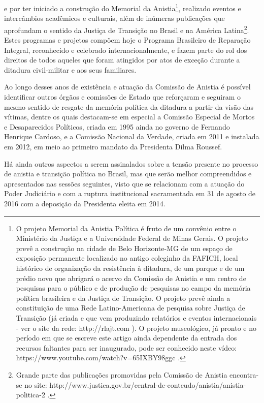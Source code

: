 e por ter iniciado a construção do Memorial da Anistia\footnote{O
  projeto Memorial da Anistia Política é fruto de um convênio entre o
  Ministério da Justiça e a Universidade Federal de Minas Gerais. O
  projeto prevê a construção na cidade de Belo Horizonte-MG de um espaço
  de exposição permanente localizado no antigo coleginho da FAFICH,
  local histórico de organização da resistência à ditadura, de um parque
  e de um prédio novo que abrigará o acervo da Comissão de Anistia e um
  centro de pesquisas para o público e de produção de pesquisas no campo
  da memória política brasileira e da Justiça de Transição. O projeto
  prevê ainda a constituição de uma Rede Latino-Americana de pesquisa
  sobre Justiça de Transição (já criada e que vem produzindo relatórios
  e eventos internacionais - ver o site da rede: http://rlajt.com ). O
  projeto museológico, já pronto e no período em que se escreve este
  artigo ainda dependente da entrada dos recursos faltantes para ser
  inaugurado, pode ser conhecido neste vídeo:
  https://www.youtube.com/watch?v=65IXBY98ggc .}, realizado eventos e
intercâmbios acadêmicos e culturais, além de inúmeras publicações que
aprofundam o sentido da Justiça de Transição no Brasil e na América
Latina\footnote{Grande parte das publicações promovidas pela Comissão de
  Anistia encontra-se no site:
  http://www.justica.gov.br/central-de-conteudo/anistia/anistia-politica-2
  .}. Estes programas e projetos compõem hoje o Programa Brasileiro de
Reparação Integral, reconhecido e celebrado internacionalmente, e fazem
parte do rol dos direitos de todos aqueles que foram atingidos por atos
de exceção durante a ditadura civil-militar e aos seus familiares.

Ao longo desses anos de existência e atuação da Comissão de Anistia é
possível identificar outros órgãos e comissões de Estado que reforçaram
e seguiram o mesmo sentido de resgate da memória política da ditadura a
partir da visão das vítimas, dentre os quais destacam-se em especial a
Comissão Especial de Mortos e Desaparecidos Políticos, criada em 1995
ainda no governo de Fernando Henrique Cardoso, e a Comissão Nacional da
Verdade, criada em 2011 e instalada em 2012, em meio ao primeiro mandato
da Presidenta Dilma Roussef.

Há ainda outros aspectos a serem assinalados sobre a tensão presente no
processo de anistia e transição política no Brasil, mas que serão melhor
compreendidos e apresentados nas sessões seguintes, visto que se
relacionam com a atuação do Poder Judiciário e com a ruptura
institucional sacramentada em 31 de agosto de 2016 com a deposição da
Presidenta eleita em 2014.

